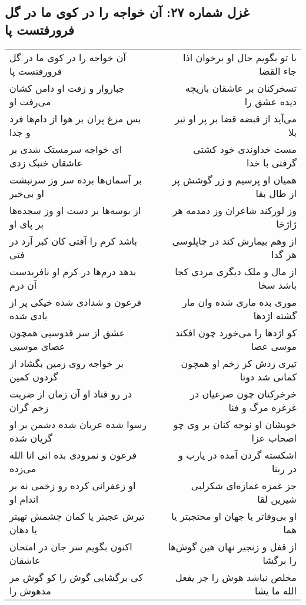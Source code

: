 \begin{center}
\section*{غزل شماره ۲۷: آن خواجه را در کوی ما در گل فرورفتست پا}
\label{sec:0027}
\begin{longtable}{l p{0.5cm} r}
آن خواجه را در کوی ما در گل فرورفتست پا
&&
با تو بگویم حال او برخوان اذا جاء القضا
\\
جباروار و زفت او دامن کشان می‌رفت او
&&
تسخرکنان بر عاشقان بازیچه دیده عشق را
\\
بس مرغ پران بر هوا از دام‌ها فرد و جدا
&&
می‌آید از قبضه قضا بر پر او تیر بلا
\\
ای خواجه سرمستک شدی بر عاشقان خنبک زدی
&&
مست خداوندی خود کشتی گرفتی با خدا
\\
بر آسمان‌ها برده سر وز سرنبشت او بی‌خبر
&&
همیان او پرسیم و زر گوشش پر از طال بقا
\\
از بوسه‌ها بر دست او وز سجده‌ها بر پای او
&&
وز لورکند شاعران وز دمدمه هر ژاژخا
\\
باشد کرم را آفتی کان کبر آرد در فتی
&&
از وهم بیمارش کند در چاپلوسی هر گدا
\\
بدهد درم‌ها در کرم او نافریدست آن درم
&&
از مال و ملک دیگری مردی کجا باشد سخا
\\
فرعون و شدادی شده خیکی پر از بادی شده
&&
موری بده ماری شده وان مار گشته اژدها
\\
عشق از سر قدوسیی همچون عصای موسیی
&&
کو اژدها را می‌خورد چون افکند موسی عصا
\\
بر خواجه روی زمین بگشاد از گردون کمین
&&
تیری زدش کز زخم او همچون کمانی شد دوتا
\\
در رو فتاد او آن زمان از ضربت زخم گران
&&
خرخرکنان چون صرعیان در غرغره مرگ و فنا
\\
رسوا شده عریان شده دشمن بر او گریان شده
&&
خویشان او نوحه کنان بر وی چو اصحاب عزا
\\
فرعون و نمرودی بده انی انا الله می‌زده
&&
اشکسته گردن آمده در یارب و در ربنا
\\
او زعفرانی کرده رو زخمی نه بر اندام او
&&
جز غمزه غمازه‌ای شکرلبی شیرین لقا
\\
تیرش عجبتر یا کمان چشمش تهیتر یا دهان
&&
او بی‌وفاتر یا جهان او محتجبتر یا هما
\\
اکنون بگویم سر جان در امتحان عاشقان
&&
از قفل و زنجیر نهان هین گوش‌ها را برگشا
\\
کی برگشایی گوش را کو گوش مر مدهوش را
&&
مخلص نباشد هوش را جز یفعل الله ما یشا
\\

\end{longtable}
\end{center}
